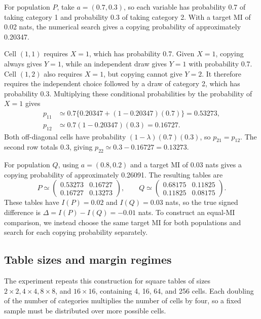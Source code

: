 \medskip
{}

For population \(P\), take \(a=(0.7,0.3)\), so each variable has
probability 0.7 of taking category 1 and probability 0.3 of taking
category 2. With a target MI of 0.02 nats, the numerical search gives
a copying probability of approximately 0.20347.

Cell \((1,1)\) requires \(X=1\), which has probability 0.7. Given
\(X=1\), copying always gives \(Y=1\), while an independent draw gives
\(Y=1\) with probability 0.7. Cell \((1,2)\) also requires \(X=1\),
but copying cannot give \(Y=2\). It therefore requires the independent
choice followed by a draw of category 2, which has probability 0.3.
Multiplying these conditional probabilities by the probability of
\(X=1\) gives
\begin{align*}
 p_{11}&\simeq0.7\{0.20347+(1-0.20347)(0.7)\}=0.53273,\\
 p_{12}&\simeq0.7(1-0.20347)(0.3)=0.16727.
\end{align*}
Both off-diagonal cells have probability \((1-\lambda)(0.7)(0.3)\), so
\(p_{21}=p_{12}\). The second row totals 0.3, giving
\(p_{22}\simeq0.3-0.16727=0.13273\).

For population \(Q\), using \(a=(0.8,0.2)\) and a target MI of 0.03 nats
gives a copying probability of approximately 0.26091. The resulting
tables are
\begin{equation}
 P\simeq\begin{pmatrix}0.53273&0.16727\\0.16727&0.13273\end{pmatrix},
 \qquad
 Q\simeq\begin{pmatrix}0.68175&0.11825\\0.11825&0.08175\end{pmatrix}.
 \label{eq:design-example-pair}
\end{equation}
These tables have \(I(P)=0.02\) and \(I(Q)=0.03\) nats, so the true
signed difference is \(\Delta=I(P)-I(Q)=-0.01\) nats. To construct an
equal-MI comparison, we instead choose the
same target MI for both populations and search for each copying
probability separately.

\subsection{Table sizes and margin regimes}

The experiment repeats this construction for square tables of sizes
\(2\times2,4\times4,8\times8\), and \(16\times16\), containing
4, 16, 64, and 256 cells. Each doubling of the number of categories multiplies the number of
cells by four, so a fixed sample must be distributed over more possible
cells.

